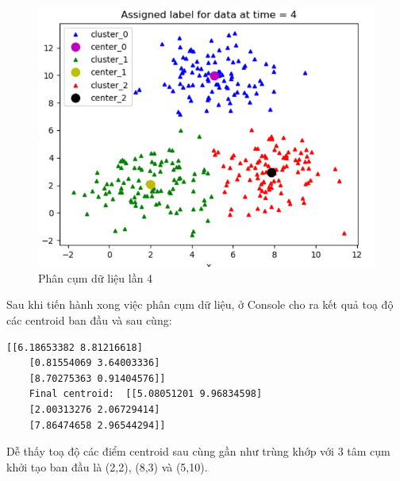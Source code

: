 \documentclass{article}
\begin{document}
	\newpage
	\begin{figure}[h]
		\centering
		\includegraphics[width=0.6\linewidth]{img/py_ex_7}
		\caption{Phân cụm dữ liệu lần 4}
	\end{figure}\par
	Sau khi tiến hành xong việc phân cụm dữ liệu, ở Console cho ra kết quả toạ độ các centroid ban đầu và sau cùng:
	\begin{lstlisting}[style=myPythonStyle]
	[[6.18653382 8.81216618]
	[0.81554069 3.64003336]
	[8.70275363 0.91404576]]
	Final centroid:  [[5.08051201 9.96834598]
	[2.00313276 2.06729414]
	[7.86474658 2.96544294]]
	\end{lstlisting}
	Dễ thấy toạ độ các điểm centroid sau cùng gần như trùng khớp với 3 tâm cụm khởi tạo ban đầu là (2,2), (8,3) và (5,10).
\end{document}
